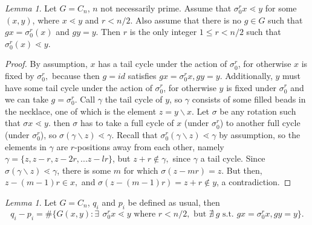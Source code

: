 \documentclass[10 pt]{amsart}
\theoremstyle{plain}
\theoremstyle{definition}
\theoremstyle{remark}
\numberwithin{equation}{section}
\newtheorem{lem}[thm]{Lemma}
\theoremstyle{remark}
\newcommand{\minus}{\backslash}
\begin{document}
\begin{lem}{\label{lem:cyclic_bound_r}}
Let $G = C_n$, $n$ not necessarily prime. Assume that $\sigma_0^r x \lessdot y$ for some $(x,y)$, where $x \lessdot y$ and $r < n/2$. Also assume that there is no $g \in G$ such that $g x = \sigma_0^r (x)$ and $gy = y$. Then $r$ is the only integer $1 \le r < n/2$ such that $\sigma_0^r (x) \lessdot y$. 
\end{lem}
\begin{proof}

By assumption, $x$ has a tail cycle under the action of $\sigma_0^{r}$, for otherwise $x$ is fixed by $\sigma_0^r,$ because then $g = id$ satisfies $gx = \sigma_0^rx,gy = y.$ Additionally, $y$ must have some tail cycle under the action of $\sigma_0^r$, for otherwise $y$ is fixed under $\sigma_0^r$  and we can take $g = \sigma_0^r$.  Call $\gamma$ the tail cycle of $y$, so $\gamma$ consists of some filled beads in the necklace, one of which is the element $z = y \minus x$. Let $\sigma$ be any rotation such that $\sigma x \lessdot y$. then $\sigma$ has to take a full cycle of $x$ (under $\sigma_0^r$) to another full cycle (under $\sigma_0^r$), so $\sigma (\gamma \minus z) \lessdot \gamma$. Recall that $\sigma_0^r (\gamma \minus z) \lessdot \gamma$ by assumption, so the elements in $\gamma$ are $r$-positions away from each other, namely $\gamma = \{ z, z-r, z-2r, ... z -l r\}$, but $z+r \notin \gamma,$ since $\gamma$ a tail cycle. Since $\sigma (\gamma \minus z) \lessdot \gamma$, there is some $m$ for which $\sigma(z - m r) = z$. But then, $z-(m-1)r \in x,$ and $\sigma(z - (m-1)r) = z+r \notin y$, a contradiction. 
\end{proof}
\begin{lem}{\label{lem:cyclic_counting_difference}} 
Let $G= C_n$, $q_i$ and $p_i$ be defined as usual, 
then $$q_i - p_i = \#\{G{(x, y)} : \exists \: \, \sigma_0^r x \lessdot y \text{ where } r < n/2, \text{ but } \nexists \:  g \text{ s.t. } g x = \sigma_0 ^r x, g y = y \}.$$
\end{lem}
\end{document}
